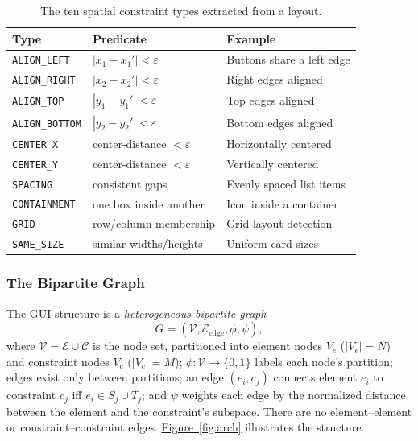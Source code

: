 \documentclass[11pt, letterpaper]{article}
\begin{document}
\begin{table}[htbp]
\caption{The ten spatial constraint types extracted from a layout.}
\label{tab:constraints}
\centering
\begin{tabularx}{\textwidth}{lXX}
\toprule
\textbf{Type} & \textbf{Predicate} & \textbf{Example} \\
\midrule
\texttt{ALIGN\_LEFT} & $|x_1-x_1'|<\varepsilon$ & Buttons share a left edge \\
\texttt{ALIGN\_RIGHT} & $|x_2-x_2'|<\varepsilon$ & Right edges aligned \\
\texttt{ALIGN\_TOP} & $|y_1-y_1'|<\varepsilon$ & Top edges aligned \\
\texttt{ALIGN\_BOTTOM} & $|y_2-y_2'|<\varepsilon$ & Bottom edges aligned \\
\texttt{CENTER\_X} & center-distance $<\varepsilon$ & Horizontally centered \\
\texttt{CENTER\_Y} & center-distance $<\varepsilon$ & Vertically centered \\
\texttt{SPACING} & consistent gaps & Evenly spaced list items \\
\texttt{CONTAINMENT} & one box inside another & Icon inside a container \\
\texttt{GRID} & row/column membership & Grid layout detection \\
\texttt{SAME\_SIZE} & similar widths/heights & Uniform card sizes \\
\bottomrule
\end{tabularx}
\end{table}

\subsubsection{The Bipartite Graph}
The GUI structure is a \emph{heterogeneous bipartite graph}
\begin{equation}
G=(\mathcal{V},\mathcal{E}_{\text{edge}},\phi,\psi),
\label{eq:graph}
\end{equation}
where $\mathcal{V}=\mathcal{E}\cup\mathcal{C}$ is the node set, partitioned
into element nodes $V_e$ ($|V_e|=N$) and constraint nodes $V_c$ ($|V_c|=M$);
$\phi:\mathcal{V}\to\{0,1\}$ labels each node's partition; edges exist only
between partitions; an edge $(e_i,c_j)$ connects element $e_i$ to
constraint $c_j$ iff $e_i\in S_j\cup T_j$; and $\psi$ weights each edge by
the normalized distance between the element and the constraint's subspace.
There are no element--element or constraint--constraint edges. \hyperref[fig:arch]{Figure~\ref{fig:arch}}
illustrates the structure.
\end{document}
